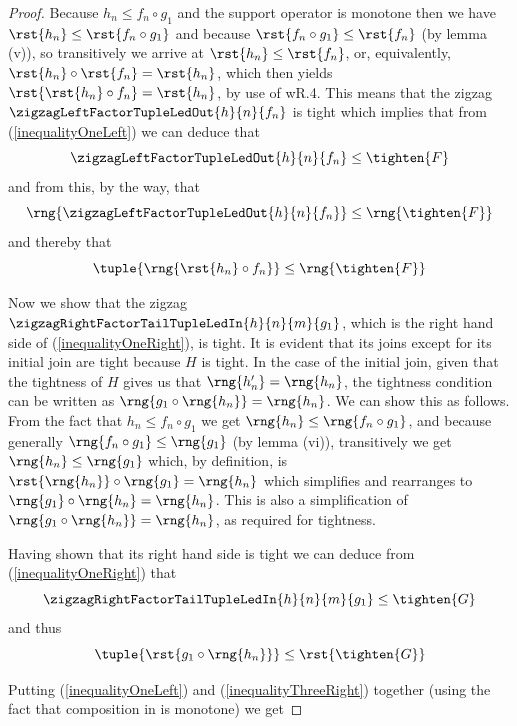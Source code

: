 \begin{proof}
Because $h_n \leq f_n \circ g_1$ and the support operator is monotone
then we have
$\rst{h_n} \leq \rst{f_n \circ g_1}$
and because $\rst{f_n \circ g_1} \leq \rst{f_n}$ (by lemma (v)), 
so transitively we arrive at $\rst{h_n} \leq \rst{f_n}$, or, 
equivalently, $\rst{h_n} \circ \rst{f_n} = \rst{h_n}$, which then yields $\rst{\rst{h_n} \circ f_n} = \rst{h_n}$, by use of wR.4.
This means  that the zigzag  
$\zigzagLeftFactorTupleLedOut{h}{n}{f_n}$ 
is tight which implies that
 from (\ref{inequalityOneLeft})  we can deduce that
\[
\zigzagLeftFactorTupleLedOut{h}{n}{f_n} \leq \tighten{F}
\]
and from this, by the way, that
\[
\rng{\zigzagLeftFactorTupleLedOut{h}{n}{f_n}} 
\leq \rng{\tighten{F}}
\]
and thereby that
\begin{equation}
\label{inequalityThreeLeft}
\tuple{\rng{\rst{h_n} \circ f_n}} \leq \rng{\tighten{F}}
\end{equation}

Now we show that the zigzag 
$\zigzagRightFactorTailTupleLedIn{h}{n}{m}{g_1}$,
which is the right hand side of (\ref{inequalityOneRight}),
is tight. It is evident that its joins except for its initial join are tight because $H$ is tight.
In the case of the initial join,
given that the tightness of $H$ gives us 
that $\rng{h'_n}=\rng{h_n}$,
the tightness condition can be written as
$\rng{g_1 \circ \rng{h_n}} = \rng{h_n}$.
We can show this as follows.  
From the fact that
$h_n \leq f_n \circ g_1$ we get
$\rng{h_n} \leq \rng{f_n \circ g_1}$,
and because generally $\rng{f_n \circ g_1} \leq \rng{g_1}$ (by lemma (vi)),
transitively we get 
$\rng{h_n} \leq \rng{g_1}$
which, by definition, is $\rst{\rng{h_n}} \circ \rng{g_1} = \rng{h_n}$
which simplifies and rearranges to
$\rng{g_1} \circ \rng{h_n} = \rng{h_n}$.
This is also a simplification of
$\rng{g_1 \circ \rng{h_n}} = \rng{h_n}$, as required for tightness.

Having shown that its right hand side is tight
we can deduce from (\ref{inequalityOneRight}) that
\[
\zigzagRightFactorTailTupleLedIn{h}{n}{m}{g_1} \leq \tighten{G}
\]
and thus 
\begin{equation}
\label{inequalityThreeRight}
\tuple{\rst{ g_1 \circ \rng{h_n}}} \leq \rst{\tighten{G}}
\end{equation}

Putting (\ref{inequalityOneLeft})
 and (\ref{inequalityThreeRight}) together (using the fact that
 composition in \catcw is monotone) we get 
 

\end{proof}
